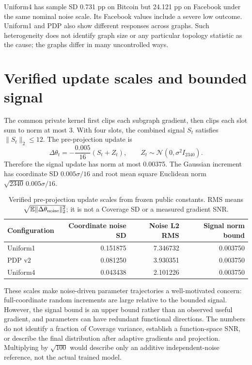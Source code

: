 Uniform4 has sample SD 0.731 pp on Bitcoin but 24.121 pp on Facebook under the same nominal noise scale. Its Facebook values include a severe low outcome. Uniform1 and PDP also show different responses across graphs. Such heterogeneity does not identify graph size or any particular topology statistic as the cause; the graphs differ in many uncontrolled ways.

\section{Verified update scales and bounded signal}
The common private kernel first clips each subgraph gradient, then clips each slot sum to norm at most 3. With four slots, the combined signal $S_t$ satisfies $\|S_t\|_2\leq12$. The pre-projection update is
\begin{equation}
 \Delta\theta_t=-\frac{0.005}{16}(S_t+Z_t),\qquad
 Z_t\sim\mathcal N(0,\sigma^2I_{2340}).
\end{equation}
Therefore the signal update has norm at most 0.00375. The Gaussian increment has coordinate SD $0.005\sigma/16$ and root mean square Euclidean norm $\sqrt{2340}\,0.005\sigma/16$.

\begin{table}[htbp]
\centering\small
\caption{Verified pre-projection update scales from frozen public constants. RMS means $\sqrt{\mathbb E\|\Delta\theta_{\rm noise}\|_2^2}$; it is not a Coverage SD or a measured gradient SNR.}\label{tab:noisescale}
\begin{tabular}{lrrr}\toprule
Configuration & Coordinate noise SD & Noise L2 RMS & Signal norm bound\\\midrule
Uniform1 & 0.151875 & 7.346732 & 0.003750\\
PDP v2 & 0.081250 & 3.930351 & 0.003750\\
Uniform4 & 0.043438 & 2.101226 & 0.003750\\\bottomrule
\end{tabular}
\end{table}

These scales make noise-driven parameter trajectories a well-motivated concern: full-coordinate random increments are large relative to the bounded signal. However, the signal bound is an upper bound rather than an observed useful gradient, and parameters can have redundant functional directions. The numbers do not identify a fraction of Coverage variance, establish a function-space SNR, or describe the final distribution after adaptive gradients and projection. Multiplying by $\sqrt{100}$ would describe only an additive independent-noise reference, not the actual trained model.

